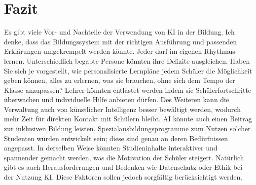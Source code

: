 \documentclass{report}
\begin{document}
\section{Fazit}
Es gibt viele Vor- und Nachteile der Verwendung von KI in der Bildung. Ich denke, dass das Bildungssystem mit der richtigen Ausführung und passenden Erklärungen umgekrempelt werden könnte. Jeder darf im eigenen Rhythmus lernen. Unterschiedlich begabte Persone könnten ihre Defizite ausgleichen.
Haben Sie sich je vorgestellt, wie personalisierte Lernpläne jedem Schüler die Möglichkeit geben können, alles zu erlernen, was sie brauchen, ohne sich dem Tempo der Klasse anzupassen? Lehrer könnten entlastet werden indem sie Schülerfortschritte überwachen und individuelle Hilfe anbieten dürfen. Des Weiteren kann die Verwaltung auch von künstlicher Intelligenz besser bewältigt werden, wodurch mehr Zeit für direkten Kontakt mit Schülern bleibt.
AI könnte auch einen Beitrag zur inklusiven Bildung leisten. Spezialausbildungsprogramme zum Nutzen solcher Studenten würden entwickelt sein; diese sind genau an deren Bedürfnissen angepasst. In derselben Weise könnten Studieninhalte interaktiver und spannender gemacht werden, was die Motivation der Schüler steigert.
Natürlich gibt es auch Herausforderungen und Bedenken wie Datenschutz oder Ethik bei der Nutzung KI. Diese Faktoren sollen jedoch sorgfältig berücksichtigt werden.
\printbibliography
\end{document}
